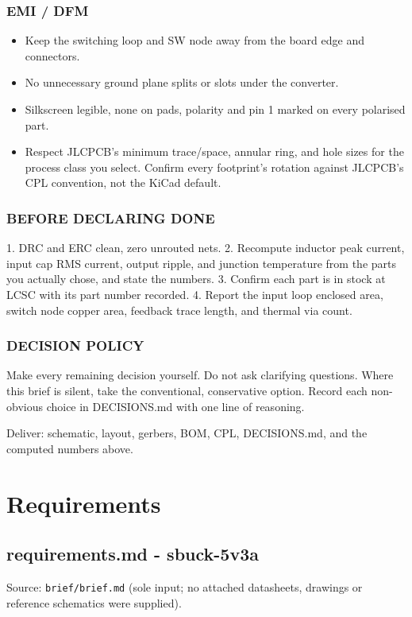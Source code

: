 \documentclass[11pt,a4paper]{article}
\begin{document}
\subsubsection*{EMI / DFM}
\begin{itemize}
\item Keep the switching loop and SW node away from the board edge and connectors.
\item No unnecessary ground plane splits or slots under the converter.
\item Silkscreen legible, none on pads, polarity and pin 1 marked on every polarised part.
\item Respect JLCPCB's minimum trace/space, annular ring, and hole sizes for the process
class you select. Confirm every footprint's rotation against JLCPCB's CPL
convention, not the KiCad default.
\end{itemize}
\subsubsection*{BEFORE DECLARING DONE}
1. DRC and ERC clean, zero unrouted nets. 2. Recompute inductor peak current, input cap RMS current, output ripple, and junction temperature from the parts you actually chose, and state the numbers. 3. Confirm each part is in stock at LCSC with its part number recorded. 4. Report the input loop enclosed area, switch node copper area, feedback trace length, and thermal via count.

\subsubsection*{DECISION POLICY}
Make every remaining decision yourself. Do not ask clarifying questions. Where this brief is silent, take the conventional, conservative option. Record each non-obvious choice in DECISIONS.md with one line of reasoning.

Deliver: schematic, layout, gerbers, BOM, CPL, DECISIONS.md, and the computed numbers above.

\section{Requirements}
\subsection*{requirements.md - sbuck-5v3a}
Source: \texttt{brief/brief.md} (sole input; no attached datasheets, drawings or reference schematics were supplied).
\end{document}

